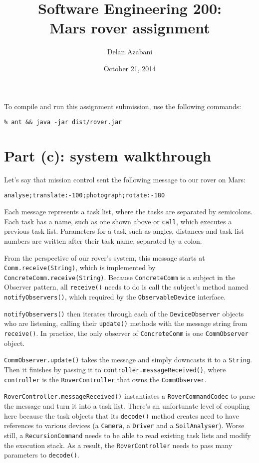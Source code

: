 \documentclass[a4paper,titlepage,12pt]{article}
\title{Software Engineering 200:\\Mars rover assignment}
\date{October 21, 2014}
\author{Delan Azabani}
\begin{document}
\maketitle
{}

To compile and run this assignment submission, use the following
commands:

\texttt{\% ant \&\& java -jar dist/rover.jar}

\section{Part (c): system walkthrough}

Let's say that mission control sent the following message to our rover
on Mars:

\texttt{analyse;translate:-100;photograph;rotate:-180}

Each message represents a task list, where the tasks are separated by
semicolons. Each task has a name, such as one shown above or
\texttt{call}, which executes a previous task list. Parameters for a
task such as angles, distances and task list numbers are written after
their task name, separated by a colon.

From the perspective of our rover's system, this message starts at
\texttt{Comm.receive(String)}, which is implemented by
\texttt{ConcreteComm.receive(String)}. Because \texttt{ConcreteComm}
is a subject in the Observer pattern, all \texttt{receive()} needs to
do is call the subject's method named \texttt{notifyObservers()}, which
required by the \texttt{ObservableDevice} interface.

\texttt{notifyObservers()} then iterates through each of the
\texttt{DeviceObserver} objects who are listening, calling their
\texttt{update()} methods with the message string from
\texttt{receive()}. In practice, the only observer of
\texttt{ConcreteComm} is one \texttt{CommObserver} object.

\texttt{CommObserver.update()} takes the message and simply downcasts
it to a \texttt{String}. Then it finishes by passing it to
\texttt{controller.messageReceived()}, where \texttt{controller} is the
\texttt{RoverController} that owns the \texttt{CommObserver}.

\texttt{RoverController.messageReceived()} instantiates a
\texttt{RoverCommandCodec} to parse the message and turn it into a task
list. There's an unfortunate level of coupling here because the task
objects that its \texttt{decode()} method creates need to have
references to various devices (a \texttt{Camera}, a \texttt{Driver} and
a \texttt{SoilAnalyser}). Worse still, a \texttt{RecursionCommand}
needs to be able to read existing task lists and modify the execution
stack. As a result, the \texttt{RoverController} needs to pass many
parameters to \texttt{decode()}.
\end{document}
